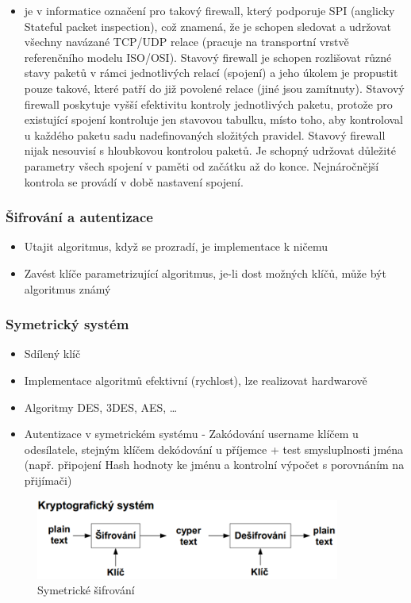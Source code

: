\documentclass[10pt,a4paper]{article}
\begin{document}
\begin{itemize}
\item je v informatice označení pro takový firewall, který podporuje SPI (anglicky Stateful packet inspection), což znamená, že je schopen sledovat a udržovat všechny navázané TCP/UDP relace (pracuje na transportní vrstvě referenčního modelu ISO/OSI). Stavový firewall je schopen rozlišovat různé stavy paketů v rámci jednotlivých relací (spojení) a jeho úkolem je propustit pouze takové, které patří do již povolené relace (jiné jsou zamítnuty). Stavový firewall poskytuje vyšší efektivitu kontroly jednotlivých paketu, protože pro existující spojení kontroluje jen stavovou tabulku, místo toho, aby kontroloval u každého paketu sadu nadefinovaných složitých pravidel. Stavový firewall nijak nesouvisí s hloubkovou kontrolou paketů. Je schopný udržovat důležité parametry všech spojení v paměti od začátku až do konce. Nejnáročnější kontrola se provádí v době nastavení spojení.
\end{itemize}
\subsubsection{Šifrování a autentizace}

\begin{itemize}
\item Utajit algoritmus, když se prozradí, je implementace k ničemu
\item Zavést klíče parametrizující algoritmus, je-li dost možných klíčů, může být algoritmus známý
\end{itemize}
\subsubsection{Symetrický systém}

\begin{itemize}
\item Sdílený klíč
\item Implementace algoritmů efektivní (rychlost), lze realizovat hardwarově
\item Algoritmy DES, 3DES, AES, …
\item Autentizace v symetrickém systému - Zakódování username klíčem u odesílatele, stejným klíčem dekódování u příjemce + test smysluplnosti jména (např. připojení Hash hodnoty ke jménu a kontrolní výpočet s porovnáním na přijímači)
\end{itemize}
\begin{figure}[ht]
    \centering
    \includegraphics[width=10cm]{sym-sifr.png}
    \caption{Symetrické šifrování}
    \label{fig:symSifr}
\end{figure}
\end{document}
